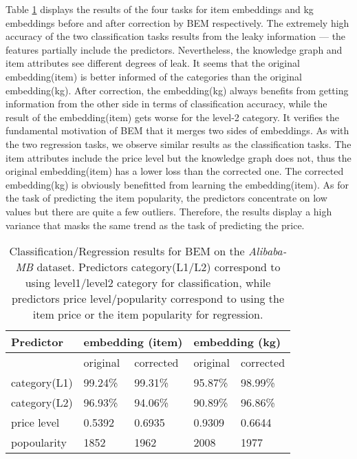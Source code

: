 Table \ref{tbl:item_pred_ali_mb} displays the results of the four tasks for item embeddings and kg embeddings before and after correction by BEM respectively. The extremely high accuracy of the two classification tasks results from the leaky information ---  the features partially include the predictors. Nevertheless, the knowledge graph and item attributes see different degrees of leak. It seems that the original embedding(item) is better informed of the categories than the original embedding(kg). After correction, the embedding(kg) always benefits from getting information from the other side in terms of classification accuracy, while the result of the embedding(item) gets worse for the level-2 category. It verifies the fundamental motivation of BEM that it merges two sides of embeddings. As with the two regression tasks, we observe similar results as the classification tasks. The item attributes include the price level but the knowledge graph does not, thus the original embedding(item) has a lower loss than the corrected one. The corrected embedding(kg) is obviously benefitted from learning the embedding(item). As for the task of predicting the item popularity, the predictors concentrate on low values but there are quite a few outliers. Therefore, the results display a high variance that masks the same trend as the task of predicting the price.



\begin{table}[h]
  \caption{Classification/Regression results for BEM on the \textit{Alibaba-MB} dataset. Predictors category(L1/L2) correspond to using level1/level2 category for classification, while predictors price level/popularity correspond to using the item price or the item popularity for regression.}
  \label{tbl:item_pred_ali_mb}
  \centering
\begin{tabular}{l|l|l|l|l}
\hline
Predictor      & \multicolumn{2}{l|}{embedding (item)} & \multicolumn{2}{l}{embedding (kg)} \\ \hline
              & original          & corrected         & original         & corrected        \\ \hline
category(L1) & 99.24\%           & 99.31\%           & 95.87\%          & 98.99\%          \\ 
category(L2) & 96.93\%           & 94.06\%           & 90.89\%          & 96.86\%          \\ 
price level   & 0.5392            & 0.6935            & 0.9309           & 0.6644           \\ 
popoularity   & 1852              & 1962              & 2008             & 1977             \\ \hline
\end{tabular}
\end{table}

